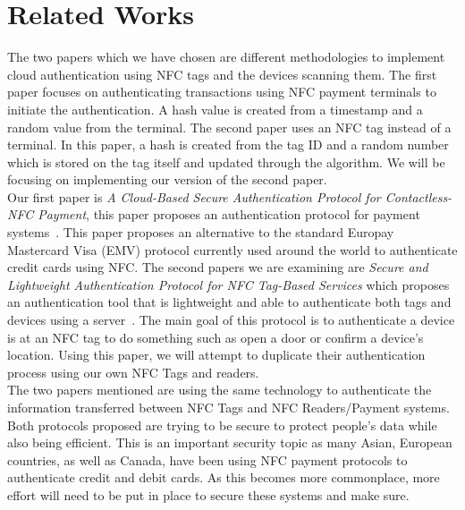 \section{Related Works}

The two papers which we have chosen are different methodologies to implement cloud authentication using NFC tags and the devices scanning them. The first paper focuses on authenticating transactions using NFC payment terminals to initiate the authentication. A hash value is created from a timestamp and a random value from the terminal. The second paper uses an NFC tag instead of a terminal. In this paper, a hash is created from the tag ID and a random number which is stored on the tag itself and updated through the algorithm. We will be focusing on implementing our version of the second paper.\\

Our first paper is \emph{A Cloud-Based Secure Authentication Protocol for Contactless-NFC Payment}, this paper proposes an authentication protocol for payment systems~\cite{7335332}. This paper proposes an alternative to the standard Europay Mastercard Visa (EMV) protocol currently used around the world to authenticate credit cards using NFC. The second papers we are examining are \emph{Secure and Lightweight Authentication Protocol for NFC Tag-Based Services} which proposes an authentication tool that is lightweight and able to authenticate both tags and devices using a server~\cite{7153937}. The main goal of this protocol is to authenticate a device is at an NFC tag to do something such as open a door or confirm a device’s location. Using this paper, we will attempt to duplicate their authentication process using our own NFC Tags and readers.\\

The two papers mentioned are using the same technology to authenticate the information transferred between NFC Tags and NFC Readers/Payment systems. Both protocols proposed are trying to be secure to protect people’s data while also being efficient. This is an important security topic as many Asian, European countries, as well as Canada, have been using NFC payment protocols to authenticate credit and debit cards. As this becomes more commonplace, more effort will need to be put in place to secure these systems and make sure.
